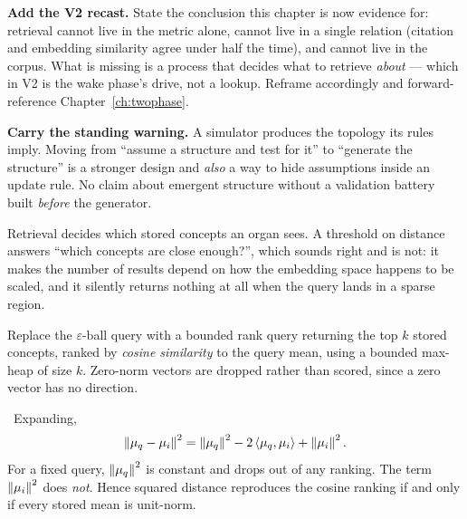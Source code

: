 \begin{workplan}{\Recast}
{  \item \textbf{Add the V2 recast.} State the conclusion this chapter is now
    evidence for: retrieval cannot live in the metric alone, cannot live in a
    single relation (citation and embedding similarity agree under half the
    time), and cannot live in the corpus. What is missing is a process that
    decides what to retrieve \emph{about} --- which in V2 is the wake phase's
    drive, not a lookup. Reframe accordingly and forward-reference
    Chapter~\ref{ch:twophase}.
  \item \textbf{Carry the standing warning.} A simulator produces the topology
    its rules imply. Moving from ``assume a structure and test for it'' to
    ``generate the structure'' is a stronger design and \emph{also} a way to
    hide assumptions inside an update rule. No claim about emergent structure
    without a validation battery built \emph{before} the generator.
}

\end{workplan}

\begin{intu}\Intu
Retrieval decides which stored concepts an organ sees. A threshold on
distance answers ``which concepts are close enough?'', which sounds
right and is not: it makes the number of results depend on how the
embedding space happens to be scaled, and it silently returns nothing at
all when the query lands in a sparse region.
\end{intu}

\begin{construction}\label{con:topk}
Replace the $\varepsilon$-ball query with a bounded rank query returning
the top $k$ stored concepts, ranked by \emph{cosine similarity} to the
query mean, using a bounded max-heap of size $k$. Zero-norm vectors are
dropped rather than scored, since a zero vector has no direction.
\end{construction}

\begin{proposition}\label{prop:cosine}
\Proved\ Expanding,
\[
  \left\lVert \mu_q-\mu_i \right\rVert^2
  =\left\lVert \mu_q \right\rVert^2-2\left\langle \mu_q,\mu_i\right\rangle+\left\lVert \mu_i \right\rVert^2 .
\]
For a fixed query, $\left\lVert \mu_q \right\rVert^2$ is constant and drops out of any
ranking. The term $\left\lVert \mu_i \right\rVert^2$ does \emph{not}. Hence squared
distance reproduces the cosine ranking if and only if every stored mean
is unit-norm.
\end{proposition}

